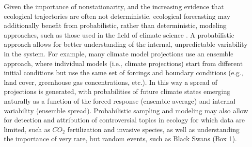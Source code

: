 \documentclass[11pt,a4paper,oneside]{article}
\begin{document}
Given the importance of nonstationarity, and the increasing evidence that ecological trajectories are often not deterministic, ecological forecasting may additionally benefit from probabilistic, rather than deterministic, modeling approaches, such as those used in the field of climate science \citep{Tebaldi2007}. A probabilistic approach allows for better understanding of the internal, unpredictable variability in the system. For example, many climate model projections use an ensemble approach, where individual models (i.e., climate projections) start from different initial conditions but use the same set of forcings and boundary conditions (e.g., land cover, greenhouse gas concentrations, etc.). In this way a spread of projections is generated, with probabilities of future climate states emerging naturally as a function of the forced response (ensemble average) and internal variability (ensemble spread). Probabilistic sampling and modeling may also allow for detection and attribution of controversial topics in ecology for which data are limited, such as $CO_{2}$ fertilization and invasive species, as well as understanding the importance of very rare, but random events, such as Black Swans (Box 1).\\

\\
\end{document}
